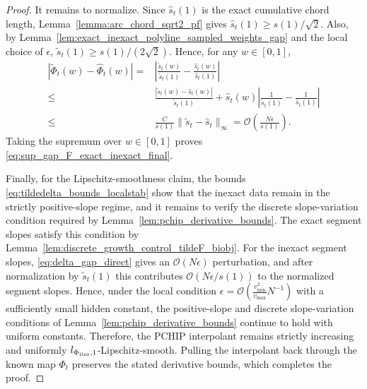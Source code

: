 \documentclass{article}
\newcommand{\Oc}{\mathcal{O}}
\newcommand{\Farc}{\Phi}
\begin{document}
\begin{proof}
It remains to normalize. Since $\hat s_t(1)$ is the exact cumulative chord length, Lemma~\ref{lemma:arc_chord_sqrt2_pf} gives $\hat s_t(1)\ge s(1)/\sqrt2$. Also, by Lemma~\ref{lem:exact_inexact_polyline_sampled_weights_gap} and the local choice of $\epsilon$, $\tilde s_t(1)\ge s(1)/(2\sqrt2)$. Hence, for any $w\in[0,1]$,
\begin{align}
|\tilde \Farc_t(w)-\hat \Farc_t(w)| = & \left| \frac{\tilde s_t(w)}{\tilde s_t(1)} - \frac{\hat s_t(w)}{\hat s_t(1)} \right| \nonumber\\
\le & \frac{|\tilde s_t(w)-\hat s_t(w)|}{\tilde s_t(1)}+\hat s_t(w)\left| \frac{1}{\tilde s_t(1)}-\frac{1}{\hat s_t(1)} \right| \nonumber\\
\le & \frac{C}{s(1)}\|\tilde s_t-\hat s_t\|_\infty = \Oc\left(\frac{N\epsilon}{s(1)}\right).
\end{align}
Taking the supremum over $w\in[0,1]$ proves \eqref{eq:sup_gap_F_exact_inexact_final}. 

Finally, for the Lipschitz-smoothness claim, the bounds \eqref{eq:tildedelta_bounds_localstab} show that the inexact data remain in the strictly positive-slope regime, and it remains to verify the discrete slope-variation condition required by Lemma~\ref{lem:pchip_derivative_bounds}. The exact segment slopes satisfy this condition by Lemma~\ref{lem:discrete_growth_control_tildeF_biobj}. For the inexact segment slopes, \eqref{eq:delta_gap_direct} gives an $\Oc(N\epsilon)$ perturbation, and after normalization by $\tilde s_t(1)$ this contributes $\Oc(N\epsilon/s(1))$ to the normalized segment slopes. Hence, under the local condition $\epsilon=\Oc\left(\frac{v_{\min}^2}{v_{\max}}N^{-1}\right)$ with a sufficiently small hidden constant, the positive-slope and discrete slope-variation conditions of Lemma~\ref{lem:pchip_derivative_bounds} continue to hold with uniform constants. Therefore, the PCHIP interpolant remains strictly increasing and uniformly $l_{\Farc_{\rm iter},1}$-Lipschitz-smooth. Pulling the interpolant back through the known map $\Farc_t$ preserves the stated derivative bounds, which completes the proof.
\end{proof}
\end{document}

